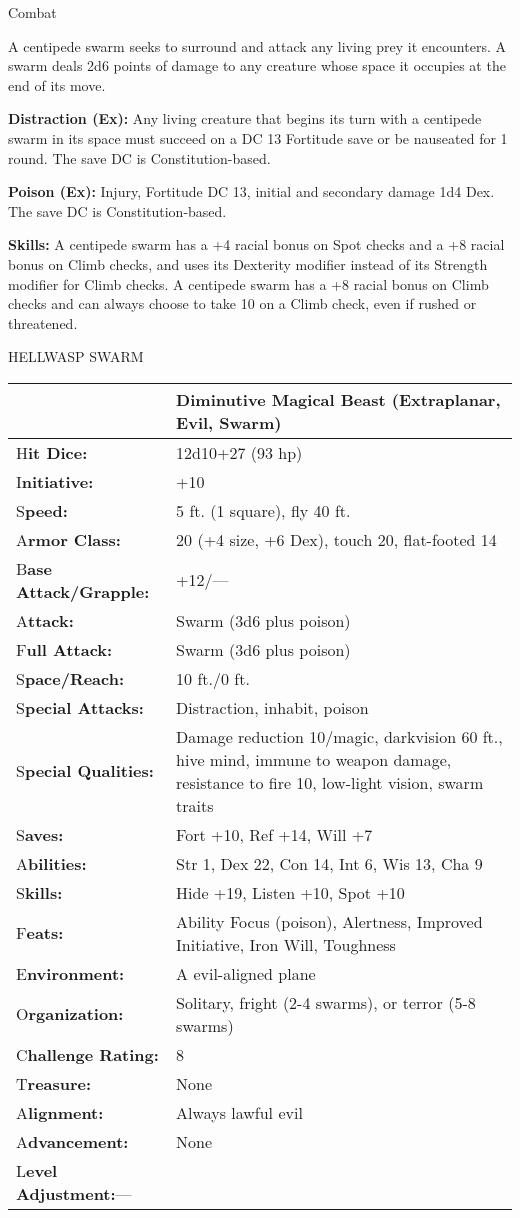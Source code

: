 \documentclass{article}
\begin{document}
Combat

A centipede swarm seeks to surround and attack any living prey it encounters. A 
swarm deals 2d6 points of damage to any creature whose space it occupies at the 
end of its move.

\textbf{Distraction (Ex): }Any living creature that begins its turn with a centipede 
swarm in its space must succeed on a DC 13 Fortitude save or be nauseated for 1 
round. The save DC is Constitution-based.

\textbf{Poison (Ex):} Injury, Fortitude DC 13, initial and secondary damage 1d4 
Dex. The save DC is Constitution-based.

\textbf{Skills:} A centipede swarm has a +4 racial bonus on Spot checks and a +8 
racial bonus on Climb checks, and uses its Dexterity modifier instead of its Strength 
modifier for Climb checks. A centipede swarm has a +8 racial bonus on Climb checks 
and can always choose to take 10 on a Climb check, even if rushed or threatened.

\vspace{12pt}
HELLWASP SWARM

\begin{tabular}{|>{\raggedright}p{91pt}|>{\raggedright}p{229pt}|}
\hline
  & Diminutive Magical Beast (Extraplanar, Evil, Swarm)\tabularnewline
\hline
H\textbf{it Dice:} & 12d10+27 (93 hp)\tabularnewline
\hline
I\textbf{nitiative:} & +10\tabularnewline
\hline
S\textbf{peed:} & 5 ft. (1 square), fly 40 ft.\tabularnewline
\hline
A\textbf{rmor Class:} & 20 (+4 size, +6 Dex), touch 20, flat-footed 14\tabularnewline
\hline
B\textbf{ase Attack/Grapple:} & +12/---\tabularnewline
\hline
A\textbf{ttack:} & Swarm (3d6 plus poison)\tabularnewline
\hline
F\textbf{ull Attack:} & Swarm (3d6 plus poison)\tabularnewline
\hline
S\textbf{pace/Reach:} & 10 ft./0 ft.\tabularnewline
\hline
S\textbf{pecial Attacks:} & Distraction, inhabit, poison\tabularnewline
\hline
S\textbf{pecial Qualities:} & Damage reduction 10/magic, darkvision 60 ft., hive 
mind, immune to weapon damage, resistance to fire 10, low-light vision, swarm traits\tabularnewline
\hline
S\textbf{aves:} & Fort +10, Ref +14, Will +7\tabularnewline
\hline
A\textbf{bilities:} & Str 1, Dex 22, Con 14, Int 6, Wis 13, Cha 9\tabularnewline
\hline
S\textbf{kills:} & Hide +19, Listen +10, Spot +10\tabularnewline
\hline
F\textbf{eats:} & Ability Focus (poison), Alertness, Improved Initiative, Iron 
Will, Toughness\tabularnewline
\hline
E\textbf{nvironment:} & A evil-aligned plane\tabularnewline
\hline
O\textbf{rganization:} & Solitary, fright (2-4 swarms), or terror (5-8 swarms)\tabularnewline
\hline
C\textbf{hallenge Rating:} & 8\tabularnewline
\hline
T\textbf{reasure:} & None\tabularnewline
\hline
A\textbf{lignment:} & Always lawful evil\tabularnewline
\hline
A\textbf{dvancement:} & None\tabularnewline
\hline
L\textbf{evel Adjustment:}--- & \tabularnewline
\hline
\end{tabular}
\end{document}
